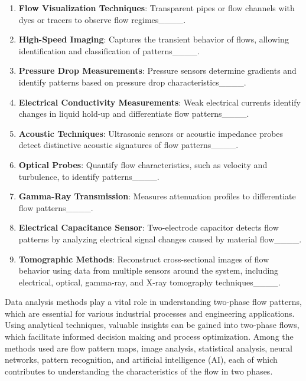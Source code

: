 \begin{enumerate} 
    \item \textbf{Flow Visualization Techniques}: Transparent pipes or flow channels with dyes or tracers to observe flow regimes____.
    
    \item \textbf{High-Speed Imaging}: Captures the transient behavior of flows, allowing identification and classification of patterns____.
    
    \item \textbf{Pressure Drop Measurements}: Pressure sensors determine gradients and identify patterns based on pressure drop characteristics____.
    
    \item \textbf{Electrical Conductivity Measurements}: Weak electrical currents identify changes in liquid hold-up and differentiate flow patterns____.
    
    \item \textbf{Acoustic Techniques}: Ultrasonic sensors or acoustic impedance probes detect distinctive acoustic signatures of flow patterns____.
    
    \item \textbf{Optical Probes}: Quantify flow characteristics, such as velocity and turbulence, to identify patterns____.
    
    \item \textbf{Gamma-Ray Transmission}: Measures attenuation profiles to differentiate flow patterns____.
    
    \item \textbf{Electrical Capacitance Sensor}: Two-electrode capacitor detects flow patterns by analyzing electrical signal changes caused by material flow____.
    
    \item \textbf{Tomographic Methods}: Reconstruct cross-sectional images of flow behavior using data from multiple sensors around the system, including electrical, optical, gamma-ray, and X-ray tomography techniques____.

\end{enumerate}


Data analysis methods play a vital role in understanding two-phase flow patterns, which are essential for various industrial processes and engineering applications. Using analytical techniques, valuable insights can be gained into two-phase flows, which facilitate informed decision making and process optimization. Among the methods used are flow pattern maps, image analysis, statistical analysis, neural networks, pattern recognition, and artificial intelligence (AI), each of which contributes to understanding the characteristics of the flow in two phases.

